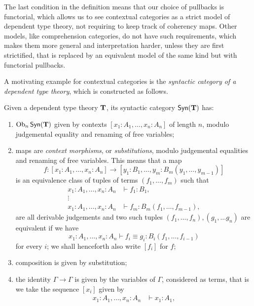 \begin{rmk}
  The last condition in the definition means that our choice of pullbacks is
  functorial, which allows us to see contextual categories as a strict model of
  dependent type theory, not requiring to keep track of coherency maps.
  Other models, like comprehension categories, do not
  have such requirements, which makes them more general and
  interpretation harder, unless they are first strictified, that is replaced by
  an equivalent model of the same kind but with functorial pullbacks.
\end{rmk}

A motivating example for contextual categories is the \emph{syntactic category
of a dependent type theory}, which is constructed as follows.

\begin{construction}\cite[2.6]{Car78}
  Given a dependent type theory $\operatorname{\mathbf{T}}$, its syntactic category $\mathsf{Syn}(\mathbf{\operatorname{\mathbf{T}}})$ has:
  \begin{enumerate}
    \item $\operatorname{Ob}_n\mathsf{Syn}(\mathbf{\operatorname{\mathbf{T}}})$ given by contexts $[x_1:A_1,\ldots,x_n:A_n]$ of length
      $n$, modulo judgemental equality and renaming of free variables;
    \item maps are \emph{context morphisms}, or \emph{substitutions}, modulo
      judgemental equalities and renaming of free variables. This means that a
      map
      \[f\colon[x_1:A_1,\ldots,x_n:A_n]\rightarrow[y_1:B_1,\ldots,y_m:B_m(y_1,\ldots,y_{m-1})]\]
      is an equivalence class of tuples of terms $(f_1,\ldots,f_m)$ such that
      \begin{align*}
        x_1:A_1,\ldots,x_n:A_n &\vdash f_1:B_1, \\
        \vdots & \\
        x_1:A_1,\ldots,x_n:A_n &\vdash f_m:B_m(f_1,\ldots,f_{m-1}),
      \end{align*}
      are all derivable judgements and two such tuples
      $(f_1,\ldots,f_n),(g_1,\ldots g_n)$ are equivalent if we have
      \[x_1:A_1,\ldots,x_n:A_n\vdash f_i\equiv g_i:B_i(f_1,\ldots,f_{i-1})\]
      for every $i$; we shall henceforth also write $[f_i]$ for $f$;
    \item composition is given by substitution;
    \item the identity $\Gamma\rightarrow\Gamma$ is given by the variables of
      $\Gamma$, considered as
      terms, that is we take the sequence $[x_i]$ given by
      \begin{align*}
        x_1:A_1,\ldots,x_n:A_n &\vdash x_1:A_1, \\

\end{align*}
\end{enumerate}
\end{construction}
